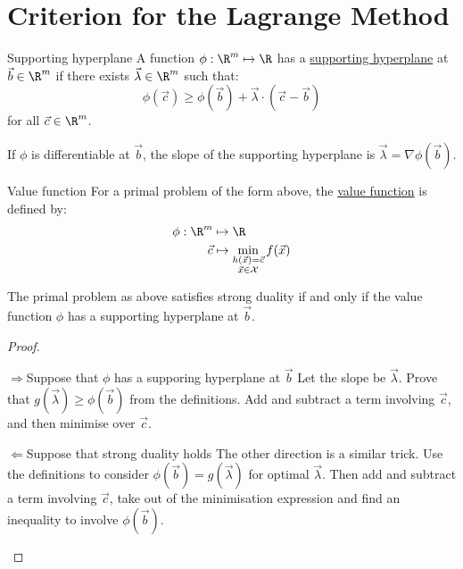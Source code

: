 \documentclass[../Main.tex]{subfiles}
\begin{document}
\section{Criterion for the Lagrange Method}
\begin{definition}{Supporting hyperplane}
    A function $\phi : \R^m \mapsto \R$ has a \underline{supporting hyperplane} at $\vec{b} \in \R^m$ if there exists $\vec{\lambda} \in \R^m$ such that:
    \begin{equation*}
        \phi(\vec{c}) \geq \phi(\vec{b}) + \vec{\lambda} \cdot (\vec{c} - \vec{b})
    \end{equation*}
    for all $\vec{c} \in \R^m$.
\end{definition}
If $\phi$ is differentiable at $\vec{b}$, the slope of the supporting hyperplane is $\vec{\lambda} = \nabla \phi(\vec{b})$.
\begin{definition}{Value function}
    For a primal problem of the form above, the \underline{value function} is defined by:
    \begin{align*}
        \phi : \R^m &\mapsto \R\\
        \vec{c} &\mapsto \min_{\substack{h(\vec{x}) = \vec{c}\\\vec{x} \in \Xset}} f(\vec{x})
    \end{align*}
\end{definition}
\begin{theorem}
    The primal problem as above satisfies strong duality if and only if the value function $\phi$ has a supporting hyperplane at $\vec{b}$.
    \label{thmSuppHyperplane}
\end{theorem}
\begin{proof}
    \begin{proofdirection}{$\Rightarrow$}{Suppose that $\phi$ has a supporing hyperplane at $\vec{b}$}
        Let the slope be $\vec{\lambda}$. Prove that $g(\vec{\lambda}) \geq \phi(\vec{b})$ from the definitions. Add and subtract a term involving $\vec{c}$, and then minimise over $\vec{c}$.
    \end{proofdirection}
    \begin{proofdirection}{$\Leftarrow$}{Suppose that strong duality holds}
        The other direction is a similar trick. Use the definitions to consider $\phi(\vec{b}) = g(\vec{\lambda})$ for optimal $\vec{\lambda}$. Then add and subtract a term involving $\vec{c}$, take out of the minimisation expression and find an inequality to involve $\phi(\vec{b})$.
    \end{proofdirection}
\end{proof}
\end{document}
